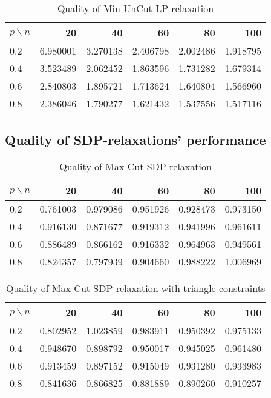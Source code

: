 \documentclass[12pt]{article}
\begin{document}
\begin{table}[H]
	\centering
	\begin{tabular}{|lrrrrr|}
		\toprule
		{$p \backslash n$} &       20  &       40  &       60  &       80  &       100 \\
		\midrule
		0.2 &  6.980001 &  3.270138 &  2.406798 &  2.002486 &  1.918795 \\
		0.4 &  3.523489 &  2.062452 &  1.863596 &  1.731282 &  1.679314 \\
		0.6 &  2.840803 &  1.895721 &  1.713624 &  1.640804 &  1.566960 \\
		0.8 &  2.386046 &  1.790277 &  1.621432 &  1.537556 &  1.517116 \\
		\bottomrule
	\end{tabular}
	\caption{Quality of Min UnCut LP-relaxation}
\end{table}


\subsection{Quality of SDP-relaxations' performance}

\begin{table}[H]
	\centering
		\begin{tabular}{|lrrrrr|}
			\toprule
			{$p \backslash n$} &       20  &       40  &       60  &       80  &       100 \\
			\midrule
			0.2 &  0.761003 &  0.979086 &  0.951926 &  0.928473 &  0.973150 \\
			0.4 &  0.916130 &  0.871677 &  0.919312 &  0.941996 &  0.961611 \\
			0.6 &  0.886489 &  0.866162 &  0.916332 &  0.964963 &  0.949561 \\
			0.8 &  0.824357 &  0.797939 &  0.904660 &  0.988222 &  1.006969 \\
			\bottomrule
		\end{tabular}
	\caption{Quality of Max-Cut SDP-relaxation}
\end{table}



\begin{table}[H]
	\centering
	\begin{tabular}{|lrrrrr|}
		\toprule
		{$p \backslash n$} &       20  &       40  &       60  &       80  &       100 \\
		\midrule
		0.2 &  0.802952 &  1.023859 &  0.983911 &  0.950392 &  0.975133 \\
		0.4 &  0.948670 &  0.898792 &  0.950017 &  0.945025 &  0.961480 \\
		0.6 &  0.913459 &  0.897152 &  0.915049 &  0.931280 &  0.933983 \\
		0.8 &  0.841636 &  0.866825 &  0.881889 &  0.890260 &  0.910257 \\
		\bottomrule
	\end{tabular}
	\caption{Quality of Max-Cut SDP-relaxation with triangle constraints}
\end{table}
\end{document}
